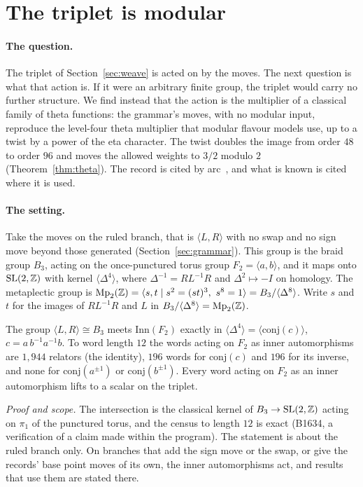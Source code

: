 \section{The triplet is modular}\label{sec:modular}

\paragraph{The question.}
The triplet of Section~\ref{sec:weave} is acted on by the moves. The next question is what that action is. If it were
an arbitrary finite group, the triplet would carry no further structure. We find instead that the action is the
multiplier of a classical family of theta functions: the grammar's moves, with no modular input, reproduce the level-four
theta multiplier that modular flavour models use, up to a twist by a power of the eta character. The twist doubles the
image from order $48$ to order $96$ and moves the allowed weights to $3/2$ modulo $2$ (Theorem~\ref{thm:theta}). The record is cited by arc~\cite{OriginAxiomRepo}, and what is known is
cited where it is used.

\paragraph{The setting.}
Take the moves on the ruled branch, that is $\langle L,R\rangle$ with no swap and no sign move beyond those generated
(Section~\ref{sec:grammar}). This group is the braid group $B_3$, acting on the once-punctured torus group $F_2=\langle
a,b\rangle$, and it maps onto $\mathrm{SL}(2,\mathbb{Z})$ with kernel $\langle\Delta^4\rangle$, where $\Delta^{-1}=RL^{-1}R$ and
$\Delta^2\mapsto-I$ on homology. The metaplectic group is $\mathrm{Mp}_2(\Z)=\langle s,t\mid s^2=(st)^3,\ s^8=1\rangle=B_3/\langle\Delta^8\rangle$.
Write $s$ and $t$ for the images of $RL^{-1}R$ and $L$ in $B_3/\langle\Delta^8\rangle=\mathrm{Mp}_2(\mathbb{Z})$.

\begin{proposition}\label{prop:inner}
The group $\langle L,R\rangle\cong B_3$ meets $\mathrm{Inn}(F_2)$ exactly in $\langle\Delta^4\rangle=\langle\mathrm{conj}(c)\rangle$, $c=a\,b^{-1}a^{-1}b$.
To word length $12$ the words acting on $F_2$ as inner automorphisms are $1{,}944$ relators (the identity), $196$ words for
$\mathrm{conj}(c)$ and $196$ for its inverse, and none for $\mathrm{conj}(a^{\pm1})$ or
$\mathrm{conj}(b^{\pm1})$. Every word acting on $F_2$ as an inner automorphism lifts to a scalar on the triplet.
\end{proposition}
\noindent\emph{Proof and scope.} The intersection is the classical kernel of $B_3\to\mathrm{SL}(2,\mathbb{Z})$ acting on $\pi_1$ of the
punctured torus, and the census to length $12$ is exact (B1634, a verification of a claim made within the program). The
statement is about the ruled branch only. On branches that add the sign move or the swap, or give the records' base
point moves of its own, the inner automorphisms act, and results that use them are stated there.

